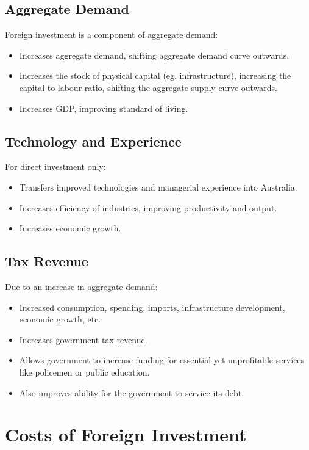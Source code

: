 \documentclass[a4paper,11pt]{report}
\begin{document}
\subsection{Aggregate Demand}

Foreign investment is a component of aggregate demand:

\begin{itemize}
\item Increases aggregate demand, shifting aggregate demand curve outwards.
\item Increases the stock of physical capital (eg. infrastructure), increasing
	the capital to labour ratio, shifting the aggregate supply curve outwards.
\item Increases GDP, improving standard of living.
\end{itemize}

\subsection{Technology and Experience}

For direct investment only:

\begin{itemize}
\item Transfers improved technologies and managerial experience into Australia.
\item Increases efficiency of industries, improving productivity and output.
\item Increases economic growth.
\end{itemize}

\subsection{Tax Revenue}

Due to an increase in aggregate demand:

\begin{itemize}
\item Increased consumption, spending, imports, infrastructure development,
	economic growth, etc.
\item Increases government tax revenue.
\item Allows government to increase funding for essential yet unprofitable
	services like policemen or public education.
\item Also improves ability for the government to service its debt.
\end{itemize}


\section{Costs of Foreign Investment}
\end{document}
